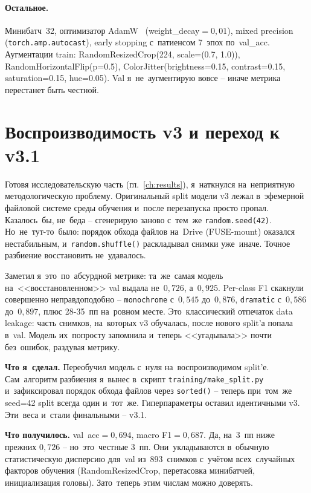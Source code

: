 \documentclass[a4paper,12pt]{diplom}
\begin{document}
\paragraph{Остальное.} Минибатч~32, оптимизатор AdamW~\cite{Kingma:2015} (weight\_decay$=0{,}01$), mixed precision (\verb|torch.amp.autocast|), early stopping с~патиенсом 7~эпох по~val\_acc. Аугментации train: RandomResizedCrop(224, scale=(0.7, 1.0)), RandomHorizontalFlip(p=0.5), ColorJitter(brightness=0.15, contrast=0.15, saturation=0.15, hue=0.05). Val я~не~аугментирую вовсе -- иначе метрика перестанет быть честной.

\section{Воспроизводимость v3 и переход к v3.1}
\label{sec:reproduce}

Готовя исследовательскую часть (гл.~\ref{ch:results}), я~наткнулся на~неприятную методологическую проблему. Оригинальный split модели v3 лежал в~эфемерной файловой системе среды обучения и~после перезапуска просто пропал. Казалось~бы, не~беда -- сгенерирую заново с~тем~же \texttt{random.seed(42)}. Но~не~тут-то~было: порядок обхода файлов на~Drive (FUSE-mount) оказался нестабильным, и~\texttt{random.shuffle()} раскладывал снимки уже~иначе. Точное разбиение восстановить не~удавалось.

Заметил я~это~по~абсурдной метрике: та~же~самая модель на~<<восстановленном>> val выдала не~$0{,}726$, а~$0{,}925$. Per-class F1 скакнули совершенно неправдоподобно -- \texttt{monochrome} с~$0{,}545$ до~$0{,}876$, \texttt{dramatic} с~$0{,}586$ до~$0{,}897$, плюс 28-35~пп на~ровном месте. Это~классический отпечаток data leakage: часть снимков, на~которых v3 обучалась, после нового split'а попала в~val. Модель их~попросту запомнила и~теперь <<угадывала>> почти без~ошибок, раздувая метрику.

\textbf{Что я~сделал.} Переобучил модель с~нуля на~воспроизводимом split'е. Сам~алгоритм разбиения я~вынес в~скрипт \verb|training/make_split.py| и~зафиксировал порядок обхода файлов через \verb|sorted()| -- теперь при~том~же seed=42 split всегда один и~тот~же. Гиперпараметры оставил идентичными v3. Эти~веса и~стали финальными -- v3.1.

\textbf{Что получилось.} val~acc$=0{,}694$, macro F1$=0{,}687$. Да, на~3~пп ниже прежних $0{,}726$ -- но~это~честные 3~пп. Они~укладываются в~обычную статистическую дисперсию для~val из~893~снимков с~учётом всех~случайных факторов обучения (RandomResizedCrop, перетасовка минибатчей, инициализация головы). Зато~теперь этим числам можно доверять.
\end{document}
